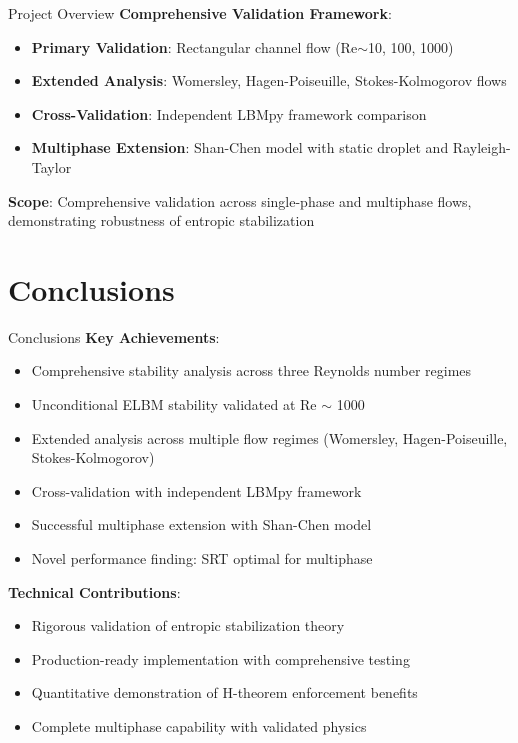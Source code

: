 \documentclass[aspectratio=169]{beamer}
\begin{document}
\begin{frame}{Project Overview}
\textbf{Comprehensive Validation Framework}:
\begin{itemize}
    \item \textbf{Primary Validation}: Rectangular channel flow (Re$\sim$10, 100, 1000)
    \item \textbf{Extended Analysis}: Womersley, Hagen-Poiseuille, Stokes-Kolmogorov flows
    \item \textbf{Cross-Validation}: Independent LBMpy framework comparison
    \item \textbf{Multiphase Extension}: Shan-Chen model with static droplet and Rayleigh-Taylor
\end{itemize}

\vspace{0.3cm}
\textbf{Scope}: Comprehensive validation across single-phase and multiphase flows, demonstrating robustness of entropic stabilization
\end{frame}

\section{Conclusions}

\begin{frame}{Conclusions}
\textbf{Key Achievements}:
\begin{itemize}
    \item Comprehensive stability analysis across three Reynolds number regimes
    \item Unconditional ELBM stability validated at Re $\sim$ 1000
    \item Extended analysis across multiple flow regimes (Womersley, Hagen-Poiseuille, Stokes-Kolmogorov)
    \item Cross-validation with independent LBMpy framework
    \item Successful multiphase extension with Shan-Chen model
    \item Novel performance finding: SRT optimal for multiphase
\end{itemize}

\vspace{0.3cm}
\textbf{Technical Contributions}:
\begin{itemize}
    \item Rigorous validation of entropic stabilization theory
    \item Production-ready implementation with comprehensive testing
    \item Quantitative demonstration of H-theorem enforcement benefits
    \item Complete multiphase capability with validated physics
\end{itemize}
\end{frame}
\end{document}
